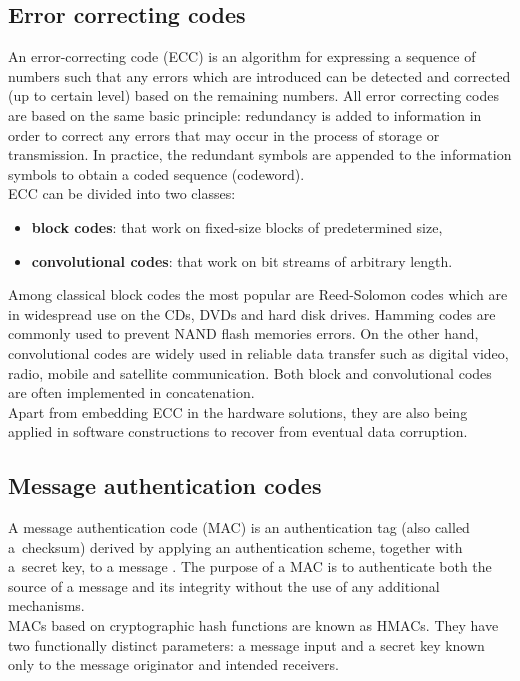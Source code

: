 		\subsection{Error correcting codes}
An error-correcting code (ECC) is an algorithm for expressing a sequence of
numbers such that any errors which are introduced can be detected and corrected
(up to certain level) based on the remaining numbers. All error
correcting codes are based on the same basic principle: redundancy is added to
information in order to correct any errors that may occur in the process of
storage or transmission. In practice, the redundant symbols are appended to the
information symbols to obtain a coded sequence (codeword).\\

ECC can be divided into two classes:

\begin{itemize}
	\item \textbf{block codes}: that work on fixed-size blocks of predetermined
	size,
	\item \textbf{convolutional codes}: that work on bit streams of arbitrary
	length.
\end{itemize}

Among classical block codes the most popular are Reed-Solomon codes which are
in widespread use on the CDs, DVDs and hard disk drives. Hamming codes are
commonly used to prevent NAND flash memories errors. On the other hand,
convolutional codes are widely used in reliable data transfer such as digital
video, radio, mobile and satellite communication. Both block and convolutional
codes are often implemented in concatenation.\\

Apart from embedding ECC in the hardware solutions, they are also being applied
in software constructions to recover from eventual data corruption.

		\subsection{Message authentication codes}
A message authentication code (MAC) is an authentication tag (also called 
a~checksum) derived by applying an authentication scheme, together with 
a~secret key, to a message \cite{nist-hmac}. The purpose of a MAC is to
authenticate both the source of a message and its integrity without the use of
any additional mechanisms.\\

MACs based on cryptographic hash functions are known as HMACs. They have two
functionally distinct parameters: a message input and a secret key known only
to the message originator and intended receivers.\\

